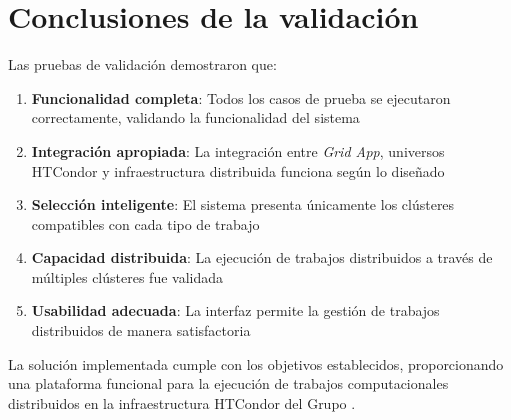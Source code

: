 \section{Conclusiones de la validación}
\noindent

Las pruebas de validación demostraron que:

\begin{enumerate}
	\item \textbf{Funcionalidad completa}: Todos los casos de prueba se ejecutaron correctamente, validando la funcionalidad del sistema
	
	\item \textbf{Integración apropiada}: La integración entre \textit{Grid App}, universos HTCondor y infraestructura distribuida funciona según lo diseñado
	
	\item \textbf{Selección inteligente}: El sistema presenta únicamente los clústeres compatibles con cada tipo de trabajo
	
	\item \textbf{Capacidad distribuida}: La ejecución de trabajos distribuidos a través de múltiples clústeres fue validada
	
	\item \textbf{Usabilidad adecuada}: La interfaz permite la gestión de trabajos distribuidos de manera satisfactoria
\end{enumerate}

La solución implementada cumple con los objetivos establecidos, proporcionando una plataforma funcional para la ejecución de trabajos computacionales distribuidos en la infraestructura HTCondor del Grupo \GRID.
